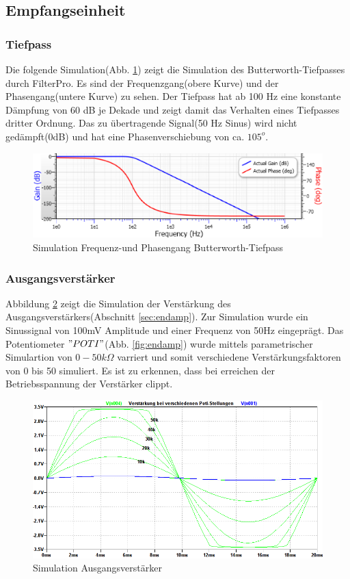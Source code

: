 \subsection{Empfangseinheit}
\subsubsection{Tiefpass}
Die folgende Simulation(Abb. \ref{fig:frequencyResponse}) zeigt die Simulation des Butterworth-Tiefpasses durch FilterPro. Es sind der Frequenzgang(obere Kurve) und der Phasengang(untere Kurve) zu sehen. Der Tiefpass hat ab 100 Hz eine konstante Dämpfung von 60 dB je Dekade und zeigt damit das Verhalten eines Tiefpasses dritter Ordnung. Das zu übertragende Signal(50 Hz  Sinus) wird nicht gedämpft(0dB) und hat eine Phasenverschiebung von ca. $105^o$.
\begin{figure}[H]
\centering
\includegraphics[scale=0.35]{gfx/simRx/FilterPro.png}
\caption{Simulation Frequenz-und Phasengang Butterworth-Tiefpass}
	\label{fig:frequencyResponse} 
\end{figure}


\subsubsection{Ausgangsverstärker}
Abbildung \ref{fig:amplifier} zeigt die Simulation der Verstärkung des Ausgangsverstärkers(Abschnitt \ref{sec:endamp}). Zur Simulation wurde ein Sinussignal von 100mV Amplitude und einer Frequenz von 50Hz eingeprägt. Das Potentiometer $"POTI"$(Abb. \ref{fig:endamp}) wurde mittels parametrischer Simulartion von $0 - 50k\Omega$ varriert und somit verschiedene Verstärkungsfaktoren von 0 bis 50 simuliert. Es ist zu erkennen, dass bei erreichen der Betriebsspannung der Verstärker clippt. 
\begin{figure}[H]
\centering
\includegraphics[scale=0.5]{gfx/simRx/amplification.png}
\caption{Simulation Ausgangsverstärker}
	\label{fig:amplifier} 
\end{figure}
